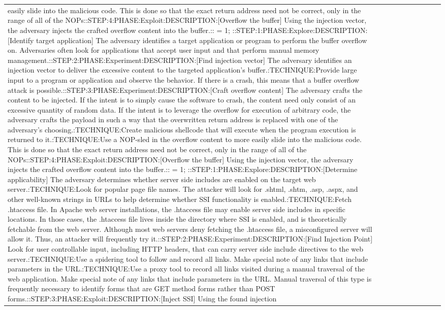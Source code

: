 \begin{table}[h]
\begin{tabular}{|p{2.1cm}|p{3.0cm}|c|c|c|c|c|c|p{2.5cm}|p{2.8cm}|}
easily slide into the malicious code. This is done so that the exact return address need not be correct, only in the range of all of the NOPs::STEP:4:PHASE:Exploit:DESCRIPTION:[Overflow the buffer] Using the injection vector, the adversary injects the crafted overflow content into the buffer.:: = 1; ::STEP:1:PHASE:Explore:DESCRIPTION:[Identify target application] The adversary identifies a target application or program to perform the buffer overflow on. Adversaries often look for applications that accept user input and that perform manual memory management.::STEP:2:PHASE:Experiment:DESCRIPTION:[Find injection vector] The adversary identifies an injection vector to deliver the excessive content to the targeted application's buffer.:TECHNIQUE:Provide large input to a program or application and observe the behavior. If there is a crash, this means that a buffer overflow attack is possible.::STEP:3:PHASE:Experiment:DESCRIPTION:[Craft overflow content] The adversary crafts the content to be injected. If the intent is to simply cause the software to crash, the content need only consist of an excessive quantity of random data. If the intent is to leverage the overflow for execution of arbitrary code, the adversary crafts the payload in such a way that the overwritten return address is replaced with one of the adversary's choosing.:TECHNIQUE:Create malicious shellcode that will execute when the program execution is returned to it.:TECHNIQUE:Use a NOP-sled in the overflow content to more easily slide into the malicious code. This is done so that the exact return address need not be correct, only in the range of all of the NOPs::STEP:4:PHASE:Exploit:DESCRIPTION:[Overflow the buffer] Using the injection vector, the adversary injects the crafted overflow content into the buffer.:: = 1; ::STEP:1:PHASE:Explore:DESCRIPTION:[Determine applicability] The adversary determines whether server side includes are enabled on the target web server.:TECHNIQUE:Look for popular page file names. The attacker will look for .shtml, .shtm, .asp, .aspx, and other well-known strings in URLs to help determine whether SSI functionality is enabled.:TECHNIQUE:Fetch .htaccess file. In Apache web server installations, the .htaccess file may enable server side includes in specific locations. In those cases, the .htaccess file lives inside the directory where SSI is enabled, and is theoretically fetchable from the web server. Although most web servers deny fetching the .htaccess file, a misconfigured server will allow it. Thus, an attacker will frequently try it.::STEP:2:PHASE:Experiment:DESCRIPTION:[Find Injection Point] Look for user controllable input, including HTTP headers, that can carry server side include directives to the web server.:TECHNIQUE:Use a spidering tool to follow and record all links. Make special note of any links that include parameters in the URL.:TECHNIQUE:Use a proxy tool to record all links visited during a manual traversal of the web application. Make special note of any links that include parameters in the URL. Manual traversal of this type is frequently necessary to identify forms that are GET method forms rather than POST forms.::STEP:3:PHASE:Exploit:DESCRIPTION:[Inject SSI] Using the found injection 
\end{tabular}
\end{table}
